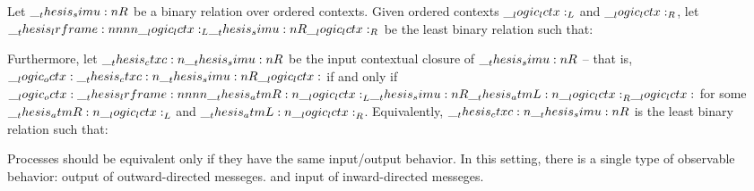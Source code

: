 \begin{definition}
  Let $\__thesis_simu:n {R}$ be a binary relation over ordered contexts.
  Given ordered contexts $\__logic_lctx:_L$ and $\__logic_lctx:_R$, let $\lrframe{\lctx_L}{\simu{R}}{\lctx_R}$ be the least binary relation such that:
  \begin{inferences}
  \end{inferences}

  Furthermore, let $\ctxc{\simu{R}}$ be the input contextual closure of $\__thesis_simu:n {R}$ -- that is, $\octx \ctxc{\simu{R}} \lctx$ if and only if $\octx \lrframe{\atmR{\lctx}_L}{\simu{R}}{\atmL{\lctx}_R} \lctx$ for some $\__thesis_atmR:n {\__logic_lctx:}_L$ and $\__thesis_atmL:n {\__logic_lctx:}_R$.
  Equivalently, $\ctxc{\simu{R}}$ is the least binary relation such that:
\end{definition}

Processes should be equivalent only if they have the same input/output behavior.
In this setting, there is a single type of observable behavior: output of outward-directed messeges.
and input of inward-directed messeges.
 


